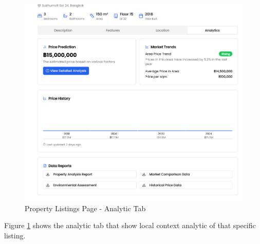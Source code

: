 \pagebreak
\begin{figure}[h]
\centering
\includegraphics[width=1\textwidth]{assets/ui/property-listing-analytics.png}
\caption{Property Listings Page - Analytic Tab}
\label{fig:property-listing-analytics}
\end{figure}


Figure \ref{fig:property-listing-analytics} shows the analytic tab that show local context analytic of that specific listing.